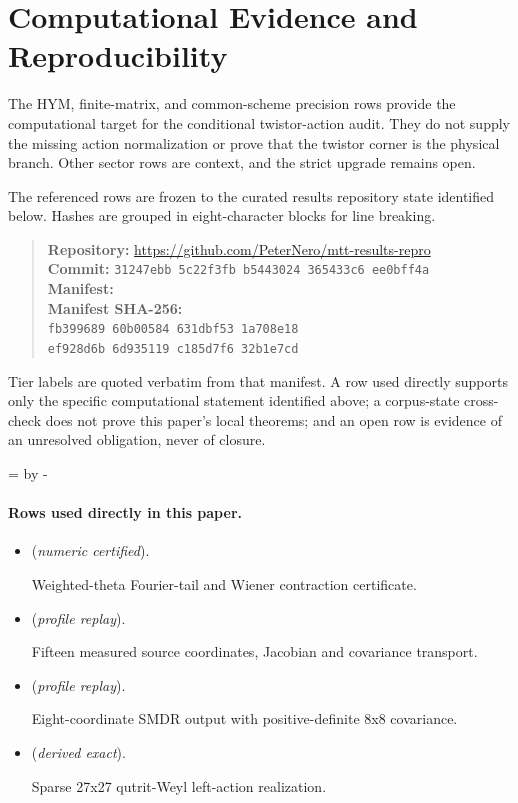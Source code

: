 \documentclass[11pt]{article}
\begin{document}
\section*{Computational Evidence and Reproducibility}
The HYM, finite-matrix, and common-scheme precision rows provide the computational target for the conditional twistor-action audit. They do not supply the missing action normalization or prove that the twistor corner is the physical branch. Other sector rows are context, and the strict upgrade remains open.

The referenced rows are frozen to the curated results repository state identified below. Hashes are grouped in eight-character blocks for line breaking.
\begin{quote}\small
\textbf{Repository:} \url{https://github.com/PeterNero/mtt-results-repro}\\
\textbf{Commit:} \texttt{31247ebb 5c22f3fb b5443024 365433c6 ee0bff4a}\\
\textbf{Manifest:} \\
\textbf{Manifest SHA-256:}\\
\texttt{fb399689 60b00584 631dbf53 1a708e18}\\
\texttt{ef928d6b 6d935119 c185d7f6 32b1e7cd}
\end{quote}

Tier labels are quoted verbatim from that manifest. A row used directly supports only the specific computational statement identified above; a corpus-state cross-check does not prove this paper's local theorems; and an open row is evidence of an unresolved obligation, never of closure.

\par\begingroup{}=\pagegoal\advance{} by -\pagetotal\ifdim\dimen0<7\baselineskip\newpage\fi\endgroup
\paragraph{Rows used directly in this paper.}
\begin{itemize}
\setlength{\itemsep}{0.25em}
\item {} (\emph{numeric certified}).\par Weighted-theta Fourier-tail and Wiener contraction certificate.
\item {} (\emph{profile replay}).\par Fifteen measured source coordinates, Jacobian and covariance transport.
\item {} (\emph{profile replay}).\par Eight-coordinate SMDR output with positive-definite 8x8 covariance.
\item {} (\emph{derived exact}).\par Sparse 27x27 qutrit-Weyl left-action realization.
\end{itemize}
\end{document}
